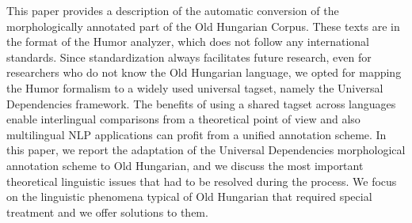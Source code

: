 This paper provides a description of the automatic conversion of the morphologically annotated part of the Old Hungarian Corpus. These texts are in the format of the Humor analyzer, which does not follow any international standards. Since standardization always facilitates future research, even for researchers who do not know the Old Hungarian language, we opted for mapping the Humor formalism to a widely used universal tagset, namely the Universal Dependencies framework. The benefits of using a shared tagset across languages enable interlingual comparisons from a theoretical point of view and also multilingual NLP applications can profit from a unified annotation scheme. In this paper, we report the adaptation of the Universal Dependencies morphological annotation scheme to Old Hungarian, and we discuss the most important theoretical linguistic issues that had to be resolved during the process. We focus on the linguistic phenomena typical of Old Hungarian that required special treatment and we offer solutions to them.
